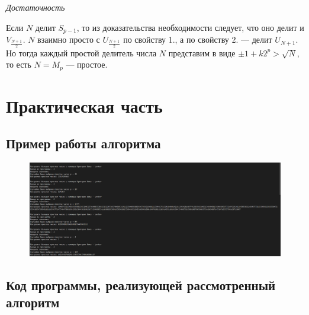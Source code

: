 \documentclass[bachelor, och, labwork]{shiza}
\begin{document}
\begin{center}
    \textit{Достаточность}
\end{center}

Если $N$ делит $S_{p-1}$, то из доказательства необходимости следует, что оно 
делит и $V_{\frac {N+1}{2}}$. $N$ взаимно просто с $U_{\frac {N+1}{2}}$ по свойству 1., 
а по свойству 2. --- делит $U_{N+1}$. Но тогда каждый простой делитель числа $N$ 
представим в виде $\pm 1+k2^{p}>{\sqrt {N}}$, то есть $N=M_{p}$ --- простое.


\section{Практическая часть}
\subsection{Пример работы алгоритма}
\begin{figure}[H]
    \centering
    \includegraphics[width=1\textwidth]{pic1.png}
    \caption{}
\end{figure}

    \subsection{Код программы, реализующей рассмотренный алгоритм}
        \inputminted{python}{lab9.py}
\end{document}
